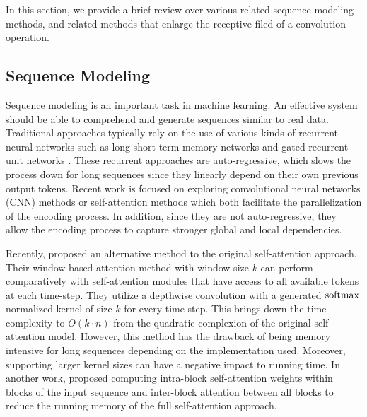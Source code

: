 \documentclass{article}
\begin{document}
In this section, we provide a brief review over various related sequence modeling methods, and related methods that enlarge the receptive filed of a convolution operation.

\subsection{Sequence Modeling}
Sequence modeling is an important task in machine learning. 
An effective
system should be able to comprehend and generate sequences similar to real data. Traditional approaches typically rely on the use of various kinds of recurrent neural networks such as long-short term memory networks \cite{doi:10.1162/neco.1997.9.8.1735,DBLP:journals/corr/SutskeverVL14,li-etal-2016-persona,LI2018301} and gated recurrent unit networks \cite{DBLP:journals/corr/ChoMGBSB14,nabil-etal-2016-cufe}. These recurrent approaches are auto-regressive, which slows the process down for long sequences since they linearly depend on their own previous output tokens. Recent work is focused on exploring convolutional neural networks (CNN) methods \cite{DBLP:journals/corr/KalchbrennerESO16,gehring2017convolutional,wu2019pay} or self-attention methods \cite{vaswani2017attention,zhang-Etal:2018:ACL2018accelerating,DBLP:journals/corr/abs-1901-02860,kitaev2020reformer} which both facilitate the parallelization of the encoding process. 
In addition, since they are not auto-regressive, they allow the encoding process to capture stronger global and local dependencies.

Recently, \citet{wu2019pay} proposed an alternative method to the original self-attention approach. Their window-based attention method with window size $k$ can perform comparatively with self-attention modules that have access to all available tokens at each time-step. They utilize a depthwise convolution with a generated $\mathrm{softmax}$ normalized kernel of size $k$ for every time-step. This brings down the time complexity to $O(k{\cdot}n)$ from the quadratic complexion of the original self-attention model. However, this method has the drawback of being memory intensive for long sequences depending on the implementation used. Moreover, supporting larger kernel sizes can have a negative impact to running time. In another work, \citet{DBLP:journals/corr/abs-1804-00857} proposed computing intra-block self-attention weights within blocks of the input sequence and inter-block attention between all blocks to reduce the running memory of the full self-attention approach.
\end{document}
